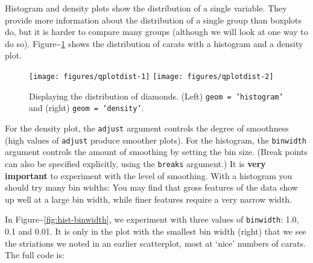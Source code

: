 Histogram and density plots show the distribution of a single variable.
They provide more information about the distribution of a single group
than boxplots do, but it is harder to compare many groups (although we
will look at one way to do so). Figure\textasciitilde{}\ref{fig:dist}
shows the distribution of carats with a histogram and a density plot.
  

\begin{Shaded}
\begin{Highlighting}[]
  \NormalTok{)}
  \NormalTok{)}
\end{Highlighting}
\end{Shaded}

\begin{figure}
\texttt{[image: figures/qplotdist-1]} \texttt{[image: figures/qplotdist-2]} \caption{Displaying the distribution of diamonds.  (Left) \texttt{geom = 'histogram'} and (right) \texttt{geom = 'density'}.\label{fig:dist}}
\end{figure}

For the density plot, the \texttt{adjust} argument controls the degree
of smoothness (high values of \texttt{adjust} produce smoother plots).
For the histogram, the \texttt{binwidth} argument controls the amount of
smoothing by setting the bin size. (Break points can also be specified
explicitly, using the \texttt{breaks} argument.) It is \textbf{very
important} to experiment with the level of smoothing. With a histogram
you should try many bin widths: You may find that gross features of the
data show up well at a large bin width, while finer features require a
very narrow width.

In Figure\textasciitilde{}\ref{fig:hist-binwidth}, we experiment with
three values of \texttt{binwidth}: 1.0, 0.1 and 0.01. It is only in the
plot with the smallest bin width (right) that we see the striations we
noted in an earlier scatterplot, most at `nice' numbers of carats. The
full code is:

